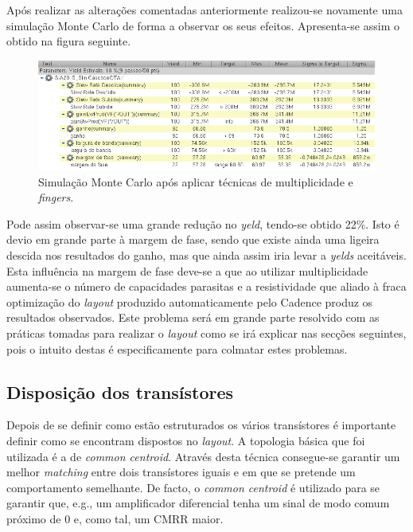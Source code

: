 \documentclass[11pt]{article}
\numberwithin{equation}{section}
\begin{document}
Após realizar as alterações comentadas anteriormente realizou-se novamente uma simulação Monte Carlo de forma a observar os seus efeitos. Apresenta-se assim o obtido na figura seguinte.

\begin{figure}[H]
	\centering
	\includegraphics[keepaspectratio=true, scale=0.65]{exps/MonteCarlo_50pt_Novo_Sin}
	\vspace{-0.5em}
	\caption{Simulação Monte Carlo após aplicar técnicas de multiplicidade e \textit{fingers}.}
	\vspace{-0.8em}
\end{figure} 

Pode assim observar-se uma grande redução no \textit{yeld}, tendo-se obtido 22\%. Isto é devio em grande parte à margem de fase, sendo que existe ainda uma ligeira descida nos resultados do ganho, mas que ainda assim iria levar a \textit{yelds} aceitáveis. Esta influência na margem de fase deve-se a que ao utilizar multiplicidade aumenta-se o número de capacidades parasitas e a resistividade que aliado à fraca optimização do \textit{layout} produzido automaticamente pelo Cadence produz os resultados observados. Este problema será em grande parte resolvido com as práticas tomadas para realizar o \textit{layout} como se irá explicar nas secções seguintes, pois o intuito destas é especificamente para colmatar estes problemas.

\subsection{Disposição dos transístores}

Depois de se definir como estão estruturados os vários transístores é importante definir como se encontram dispostos no \textit{layout}. A topologia básica que foi utilizada é a de \textit{common centroid}. Através desta técnica consegue-se garantir um melhor \textit{matching} entre dois transístores iguais e em que se pretende um comportamento semelhante. De facto, o \textit{common centroid} é utilizado para se garantir que, e.g., um amplificador diferencial tenha um sinal de modo comum próximo de 0 e, como tal, um CMRR maior.
\end{document}
